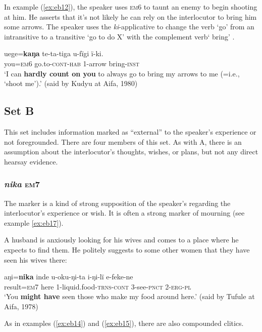 \documentclass[output=paper]{langsci/langscibook}
\begin{document}
In example (\ref{ex:eb12}), the speaker uses \textsc{em}6 to taunt an enemy to begin shooting at him. He asserts that it’s not likely he can rely on the interlocutor to bring him some arrows.  The speaker uses the \textit{ki}-applicative to change the verb ‘go’ from an  intransitive to a transitive ‘go to do X’ with the complement verb‘ bring’ .

\begin{exe}
	\ex \label{ex:eb12}
	\gll uege=\textbf{kaŋa} te-ta-tiga u-fïgi ï-ki.\\
	you=\textsc{em6} go.to-\textsc{cont-hab} 1-arrow bring-\textsc{inst}\\
	\trans  `I can \textbf{hardly count on you} to always go to bring my arrows to me (=i.e., ‘shoot me’).' (said by Kudyu at Aifa, 1980)
\end{exe}

\subsection{Set B}
This set includes information  marked as ``external'' to the speaker’s experience or not foregrounded. There are four members of this set. As with A, there is an assumption about the interlocutor’s thoughts, wishes, or plans, but not any direct hearsay evidence.
\fussy

\subsubsection{\textit{nika} \textsc{em}7}
The marker is a kind of strong supposition of the speaker’s regarding the interlocutor’s experience or wish.  It is often a strong marker of mourning (see example \ref{ex:eb17}).

A husband is anxiously looking for his wives and comes to a place where he expects to find them. He politely suggests to some other women that they have seen his wives there:

\begin{exe}
	\ex \label{ex:eb13}
	\gll aŋi=\textbf{nika} inde u-oku-ŋi-ta i-ŋi-lï e-feke-ne\\
	result=\textsc{em7} here 1-liquid.food-\textsc{trns-cont} 3-see-\textsc{pnct} 2-\textsc{erg-pl}\\
	\trans ‘You \textbf{might have} seen those who make my food around here.’ (said by Tufule at Aifa, 1978)
\end{exe}

As in examples (\ref{ex:eb14}) and (\ref{ex:eb15}), there are also compounded clitics.
\end{document}
